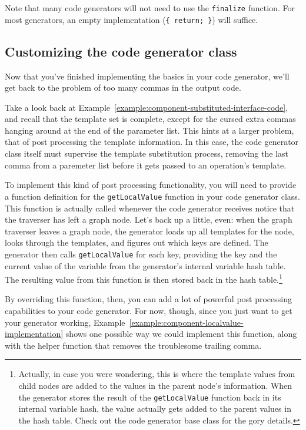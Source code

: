 Note that many code generators will not need to use the {\tt finalize} function.
For most generators, an empty implementation (\verb+{ return; }+) will suffice.

\subsection{Customizing the code generator class}
\label{subsection:component-customizing-generator}

Now that you've finished implementing the basics in your code generator, we'll
get back to the problem of too many commas in the output code.

Take a look back at Example~\ref{example:component-substituted-interface-code},
and recall that the template set is complete, except for the cursed extra commas
hanging around at the end of the parameter list. This hints at a larger problem,
that of post processing the template information. In this case, the code
generator class itself must supervise the template substitution process,
removing the last comma from a paremeter list before it gets passed to an
operation's template.

To implement this kind of post processing functionality, you will need to
provide a function definition for the {\tt getLocalValue} function in your code
generator class. This function is actually called whenever the code generator
receives notice that the traverser has left a graph node. Let's back up a
little, even: when the graph traverser leaves a graph node, the generator loads
up all templates for the node, looks through the templates, and figures out
which keys are defined. The generator then calls {\tt getLocalValue} for each
key, providing the key and the current value of the variable from the
generator's internal variable hash table. The resulting value from this function
is then stored back in the hash table.\footnote{Actually, in case you were
wondering, this is where the template values from child nodes are added to the
values in the parent node's information. When the generator stores the result of
the {\tt getLocalValue} function back in its internal variable hash, the value
actually gets added to the parent values in the hash table. Check out the code
generator base class for the gory details.}

By overriding this function, then, you can add a lot of powerful post processing
capabilities to your code generator. For now, though, since you just want to get
your generator working,
Example~\ref{example:component-localvalue-implementation} shows one possible way
we could implement this function, along with the helper function that removes
the troublesome trailing comma.


